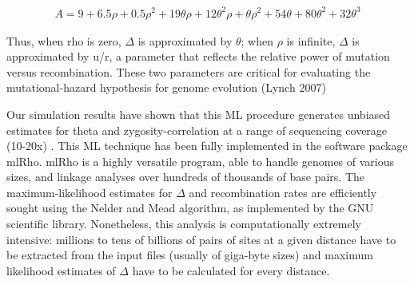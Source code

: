 \documentclass{sig-alternate}
\begin{document}
 \begin{eqnarray}
A = 9+6.5\rho + 0.5\rho^2+19\theta \rho+12\theta^2\rho+\theta \rho^2+54\theta+80\theta^2+32\theta^3
\label{eq:edelta}
\end{eqnarray}

Thus, when rho is zero, $\Delta$ is approximated by $\theta$; when $\rho$ is infinite, $\Delta$ is approximated by u/r, a parameter that reflects the relative power of mutation versus recombination. These two parameters are critical for evaluating the mutational-hazard hypothesis for genome evolution (Lynch 2007)

Our simulation results have shown that this ML procedure generates unbiased estimates for theta and zygosity-correlation at a range of sequencing coverage (10-20x) \cite{Lynch01112008}. 
This ML technique has been fully implemented in the software package mlRho. mlRho is a highly versatile program, able to handle genomes of various sizes, and linkage analyses over hundreds of thousands of base pairs. The maximum-likelihood estimates for $\Delta$ and recombination rates are efficiently sought using the Nelder and Mead algorithm, as implemented by the GNU scientific library. Nonetheless, this analysis is computationally extremely intensive: millions to tens of billions of pairs of sites at a given distance have to be extracted from the input files (usually of giga-byte sizes) and maximum likelihood estimates of $\Delta$ have to be calculated for every distance. 

\end{document}
